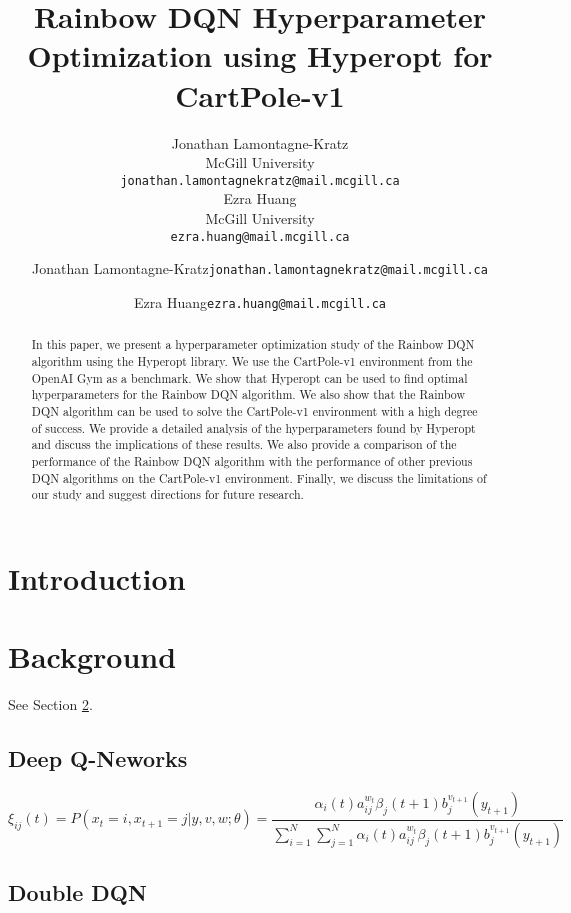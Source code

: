 \documentclass{article}
\title{Rainbow DQN Hyperparameter Optimization using Hyperopt for CartPole-v1
}
\author{%
  Jonathan Lamontagne-Kratz\\
  McGill University\\
  \texttt{jonathan.lamontagnekratz@mail.mcgill.ca} \\
  \And
  {Ezra Huang} \\
  McGill University\\
  \texttt{ezra.huang@mail.mcgill.ca} \\
}
\author[1]{%
	{\usebox\hspace{1mm}Jonathan Lamontagne-Kratz{\texttt{jonathan.lamontagnekratz@mail.mcgill.ca}}}%
}
\author[1,2]{%
    {\usebox\hspace{1mm}Ezra Huang{\texttt{ezra.huang@mail.mcgill.ca}}}%
}
\begin{document}
\maketitle

\begin{abstract}
    In this paper, we present a hyperparameter optimization study of the Rainbow DQN algorithm using the Hyperopt library. We use the CartPole-v1 environment from the OpenAI Gym as a benchmark. We show that Hyperopt can be used to find optimal hyperparameters for the Rainbow DQN algorithm. We also show that the Rainbow DQN algorithm can be used to solve the CartPole-v1 environment with a high degree of success. We provide a detailed analysis of the hyperparameters found by Hyperopt and discuss the implications of these results. We also provide a comparison of the performance of the Rainbow DQN algorithm with the performance of other previous DQN algorithms on the CartPole-v1 environment. Finally, we discuss the limitations of our study and suggest directions for future research.
\end{abstract}



\section{Introduction}
\lipsum[2]
\lipsum[3]


\section{Background}
\label{sec:headings}

\lipsum[4] See Section \ref{sec:headings}.

\subsection{Deep Q-Neworks}
\lipsum[5]
\begin{equation}
  \xi _{ij}(t)=P(x_{t}=i,x_{t+1}=j|y,v,w;\theta)= {\frac {\alpha _{i}(t)a^{w_t}_{ij}\beta _{j}(t+1)b^{v_{t+1}}_{j}(y_{t+1})}{\sum _{i=1}^{N} \sum _{j=1}^{N} \alpha _{i}(t)a^{w_t}_{ij}\beta _{j}(t+1)b^{v_{t+1}}_{j}(y_{t+1})}}
\end{equation}

\subsection{Double DQN}
\lipsum[6]
\end{document}
